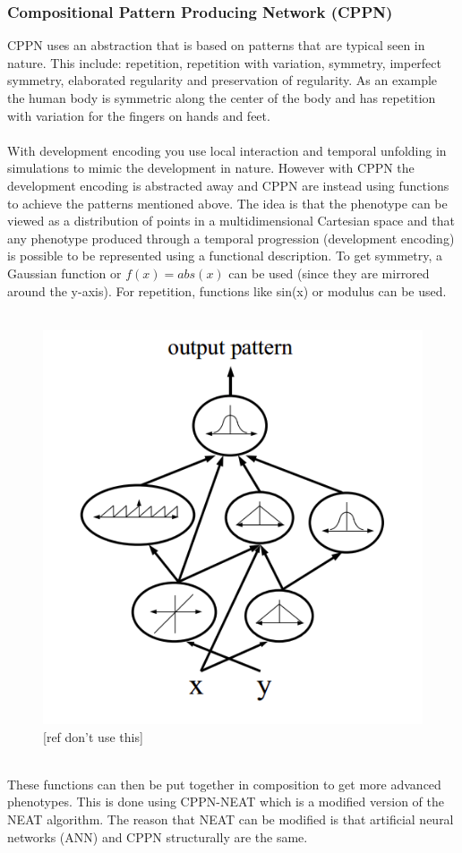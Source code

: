 \subsubsection{Compositional Pattern Producing Network (CPPN)}
CPPN uses an abstraction that is based on patterns that are typical seen in nature. This include: repetition, repetition with variation, symmetry, imperfect symmetry, elaborated regularity and preservation of regularity. As an example the human body is symmetric along the center of the body and has repetition with variation for the fingers on hands and feet.
\\ \\
With development encoding you use local interaction and temporal unfolding in simulations to mimic the development in nature. However with CPPN the development encoding is abstracted away and CPPN are instead using functions to achieve the patterns mentioned above. The idea is that the phenotype can be viewed as a distribution of points in a multidimensional Cartesian space and that any phenotype produced through a temporal progression (development encoding) is possible to be represented using a functional description. To get symmetry, a Gaussian function or $ f(x) = abs(x) $ can be used (since they are mirrored around the y-axis). For repetition, functions like sin(x) or modulus can be used. 
\\ \\
\begin{figure}[!ht]
\centering
\includegraphics[scale=0.4]{CompositionOfFunctions}
\caption{[ref don't use this]}
\end{figure}
\\
These functions can then be put together in composition to get more advanced phenotypes. This is done using CPPN-NEAT which is a modified version of the NEAT algorithm. The reason that NEAT can be modified is that artificial neural networks (ANN) and CPPN structurally are the same.

